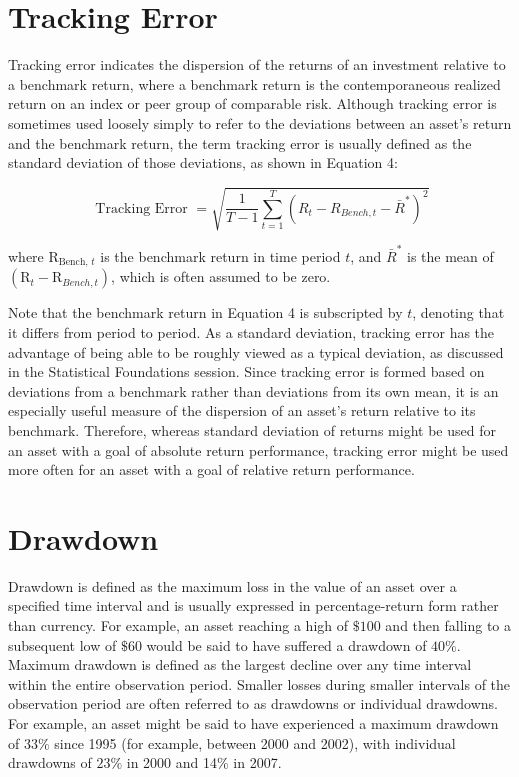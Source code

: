 \documentclass[11pt]{article}
\begin{document}
\section*{Tracking Error}
Tracking error indicates the dispersion of the returns of an investment relative to a benchmark return, where a benchmark return is the contemporaneous realized return on an index or peer group of comparable risk. Although tracking error is sometimes used loosely simply to refer to the deviations between an asset's return and the benchmark return, the term tracking error is usually defined as the standard deviation of those deviations, as shown in Equation 4:


\begin{equation*}
\text { Tracking Error }=\sqrt{\frac{1}{T-1} \sum_{t=1}^{T}\left(R_{t}-R_{B e n c h, t}-\bar{R}^{*}\right)^{2}} \tag{4}
\end{equation*}


where $\mathrm{R}_{\text {Bench, } t}$ is the benchmark return in time period $t$, and $\bar{R}^{*}$ is the mean of $\left(\mathrm{R}_{t}-\mathrm{R}_{B e n c h, t}\right)$, which is often assumed to be zero.

Note that the benchmark return in Equation 4 is subscripted by $t$, denoting that it differs from period to period. As a standard deviation, tracking error has the advantage of being able to be roughly viewed as a typical deviation, as discussed in the Statistical Foundations session. Since tracking error is formed based on deviations from a benchmark rather than deviations from its own mean, it is an especially useful measure of the dispersion of an asset's return relative to its benchmark. Therefore, whereas standard deviation of returns might be used for an asset with a goal of absolute return performance, tracking error might be used more often for an asset with a goal of relative return performance.

\section*{Drawdown}
Drawdown is defined as the maximum loss in the value of an asset over a specified time interval and is usually expressed in percentage-return form rather than currency. For example, an asset reaching a high of $\$ 100$ and then falling to a subsequent low of $\$ 60$ would be said to have suffered a drawdown of $40 \%$. Maximum drawdown is defined as the largest decline over any time interval within the entire observation period. Smaller losses during smaller intervals of the observation period are often referred to as drawdowns or individual drawdowns. For example, an asset might be said to have experienced a maximum drawdown of $33 \%$ since 1995 (for example, between 2000 and 2002), with individual drawdowns of $23 \%$ in 2000 and 14\% in 2007.
\end{document}
